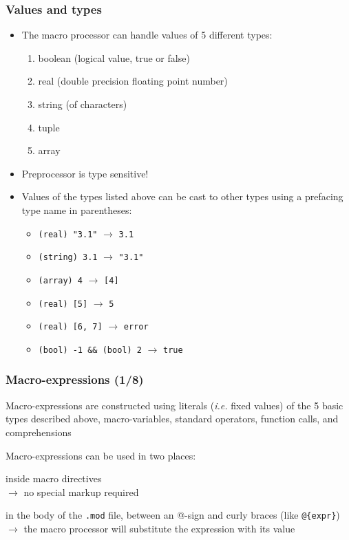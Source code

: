 \documentclass[handout,usepdftitle=false,xcolor=dvipsnames,aspectratio=169]{beamer}
\begin{document}
\begin{frame}
  \frametitle{Values and types}
  \begin{itemize}
    \item The macro processor can handle values of 5 different types:
          \begin{enumerate}
            \item boolean (logical value, true or false)
            \item real (double precision floating point number)
            \item string (of characters)
            \item tuple
            \item array
          \end{enumerate}
    \item Preprocessor is type sensitive!
    \item Values of the types listed above can be cast to other types using a prefacing type name in parentheses:
          \begin{itemize}
            \item \texttt{(real) "3.1"} $\rightarrow$ \texttt{3.1}
            \item \texttt{(string) 3.1} $\rightarrow$ \texttt{"3.1"}
            \item \texttt{(array) 4} $\rightarrow$ \texttt{[4]}
            \item \texttt{(real) [5]} $\rightarrow$ \texttt{5}
            \item \texttt{(real) [6, 7]} $\rightarrow$ \texttt{error}
            \item \texttt{(bool) -1 \&\& (bool) 2} $\rightarrow$ \texttt{true}
          \end{itemize}
  \end{itemize}
\end{frame}

\begin{frame}[fragile]
  \frametitle{Macro-expressions (1/8)}
  \begin{witemize}
    \item Macro-expressions are constructed using literals (\textit{i.e.} fixed values) of the 5 basic types
    described above, macro-variables, standard operators, function calls, and comprehensions
    \item Macro-expressions can be used in two places:
    \begin{witemize}
      \item inside macro directives\\
      $\rightarrow$ no special markup required
      \item in the body of the \texttt{.mod} file, between an @-sign and curly braces (like \verb+@{expr}+)\\
      $\rightarrow$ the macro processor will substitute the expression with its value
    \end{witemize}
  \end{witemize}
\end{frame}
\end{document}
